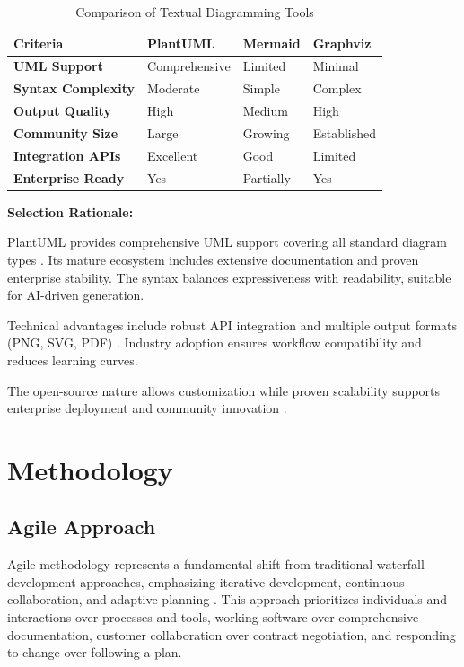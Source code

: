 \begin{table}[htbp]
\centering
\caption{Comparison of Textual Diagramming Tools}
\label{tab:diagramming_tools}
\begin{tabular}{|p{2.5cm}|p{2.5cm}|p{2.5cm}|p{2.5cm}|}
\hline
\textbf{Criteria} & \textbf{PlantUML} & \textbf{Mermaid} & \textbf{Graphviz} \\
\hline
\textbf{UML Support} & Comprehensive & Limited & Minimal \\
\hline
\textbf{Syntax Complexity} & Moderate & Simple & Complex \\
\hline
\textbf{Output Quality} & High & Medium & High \\
\hline
\textbf{Community Size} & Large & Growing & Established \\
\hline
\textbf{Integration APIs} & Excellent & Good & Limited \\
\hline
\textbf{Enterprise Ready} & Yes & Partially & Yes \\
\hline
\end{tabular}
\end{table}

\textbf{Selection Rationale:}

PlantUML provides comprehensive UML support covering all standard diagram types \cite{plantuml_documentation}. Its mature ecosystem includes extensive documentation and proven enterprise stability. The syntax balances expressiveness with readability, suitable for AI-driven generation.

Technical advantages include robust API integration and multiple output formats (PNG, SVG, PDF) \cite{plantuml_formats}. Industry adoption ensures workflow compatibility and reduces learning curves.

The open-source nature allows customization while proven scalability supports enterprise deployment and community innovation \cite{plantuml_enterprise}.

\section{Methodology}

\subsection{Agile Approach}

Agile methodology represents a fundamental shift from traditional waterfall development approaches, emphasizing iterative development, continuous collaboration, and adaptive planning \cite{agile_manifesto}. This approach prioritizes individuals and interactions over processes and tools, working software over comprehensive documentation, customer collaboration over contract negotiation, and responding to change over following a plan.

